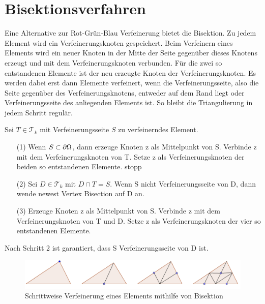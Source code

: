 \section{Bisektionsverfahren}
Eine Alternative zur Rot-Grün-Blau Verfeinerung bietet die Bisektion.  Zu jedem Element wird ein Verfeinerungsknoten gespeichert. Beim Verfeinern eines Elements wird ein neuer Knoten in der Mitte der Seite gegenüber dieses Knotens erzeugt und mit dem Verfeinerungsknoten verbunden. Für die zwei so entstandenen Elemente ist der neu erzeugte Knoten der Verfeinerungsknoten. Es werden dabei erst dann Elemente verfeinert, wenn die Verfeinerungsseite, also
die Seite gegenüber des Verfeinerungsknotens, entweder auf dem Rand liegt oder Verfeinerungsseite des anliegenden Elements ist. So bleibt die Triangulierung in jedem Schritt regulär.
\begin{algorithmus}
	Sei $T\in \mathscr{T}_k$ mit Verfeinerungsseite $S$ zu verfeinerndes Element.
	\begin{itemize}
		\item[(1)] Wenn $S \subset \partial \Omega$, dann erzeuge Knoten z als Mittelpunkt von S. Verbinde z mit dem Verfeinerungsknoten von T. Setze z als Verfeinerungsknoten der beiden so entstandenen Elemente. stopp  
		\item[(2)] Sei $D \in \mathscr{T}_k$ mit $D\cap T = S$. Wenn S nicht Verfeinerungsseite von D, dann wende newest Vertex Bisection auf D an.
		\item[(3)] Erzeuge Knoten z als Mittelpunkt von S. Verbinde z mit dem Verfeinerungsknoten von T und D. Setze z als Verfeinerungsknoten der vier so entstandenen Elemente.
	\end{itemize}
\end{algorithmus}
Nach Schritt 2 ist garantiert, dass S Verfeinerungsseite von D ist. \\

\begin{figure}[!htbp]
	\begin{center}
		\includegraphics[width=16cm]{pics/bisec1.png}
	\end{center}
	\caption{Schrittweise Verfeinerung eines Elements mithilfe von Bisektion}
\end{figure}

